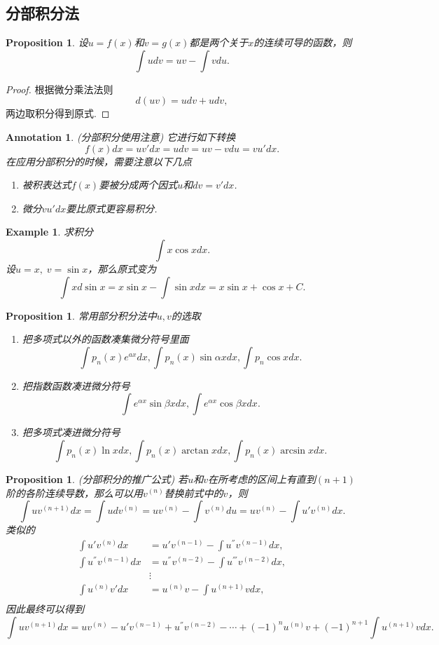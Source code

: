 \documentclass{article}
\newtheorem{proposition}[theorem]{Proposition}
\newtheorem{example}[theorem]{Example}
\newtheorem{annotation}[theorem]{Annotation}
\begin{document}
\subsection{分部积分法}

\begin{proposition}
\rm 设$u=f(x)$和$v=g(x)$都是两个关于$x$的连续可导的函数，则
$$
\int udv  = uv - \int vdu.
$$
\end{proposition}

\begin{proof}
根据微分乘法法则
$$
d(uv) = udv + udv,
$$
两边取积分得到原式.
\end{proof}

\begin{annotation}
\rm {\color{red} (分部积分使用注意)} 它进行如下转换
$$
f(x)dx = uv'dx = udv = uv-vdu = vu'dx.
$$
在应用分部积分的时候，需要注意以下几点
\begin{enumerate}
	\item 被积表达式$f(x)$要被分成两个因式$u$和$dv=v'dx$.
	\item 微分$vu'dx$要比原式更容易积分.
\end{enumerate}
\end{annotation}


\begin{example}
\rm 求积分
$$
\int x\cos xdx.
$$
设$u=x,\; v= \sin x$，那么原式变为
$$
\int xd\sin x = x\sin x - \int \sin x dx = x\sin x +\cos x + C.
$$
\end{example}

\begin{proposition}
\rm 常用部分积分法中$u,v$的选取
\begin{enumerate}
	\item 把多项式以外的函数凑集微分符号里面
	$$
	\int p_n(x)e^{ax}dx, \int p_n(x)\sin \alpha xdx,\int p_n\cos xdx.
	$$
	\item 把指数函数凑进微分符号
	$$
	\int e^{\alpha x}\sin\beta x dx, \int e^{\alpha x}\cos \beta x dx.
	$$
	\item 把多项式凑进微分符号
	$$
	\int p_n(x)\ln x dx, \int p_n(x)\arctan x dx, \int p_n(x)\arcsin x dx. 
	$$
\end{enumerate}
\end{proposition}

\begin{proposition}
\rm {\color{red} (分部积分的推广公式)} 若$u$和$v$在所考虑的区间上有直到$(n+1)$阶的各阶连续导数，那么可以用$v^{(n)}$替换前式中的$v$，则
$$
\int uv^{(n+1)}dx = \int udv^{(n)} = uv^{(n)} - \int v^{(n)}du = uv^{(n)} - \int u'v^{(n)}dx.
$$
类似的
$$
\begin{array}{ll}
\int u'v^{(n)}dx &= u'v^{(n-1)} - \int u^{''}v^{(n-1)}dx, \\
\int u^{''}v^{(n-1)}dx &= u^{''}v^{(n-2)} - \int u^{'''}v^{(n-2)}dx, \\
&\vdots \\
\int u^{(n)}v'dx &= u^{(n)}v - \int u^{(n+1)}vdx, \\
\end{array}
$$
因此最终可以得到
$$
\int uv^{(n+1)}dx = uv^{(n)} - u'v^{(n-1)} + u^{''}v^{(n-2)} -\cdots + (-1)^{n} u^{(n)}v +  (-1)^{n+1} \int u^{(n+1)}vdx.
$$
\end{proposition}
\end{document}
